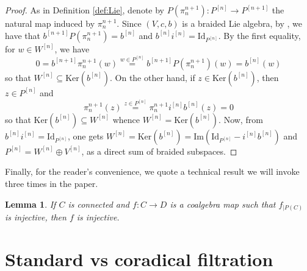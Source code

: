 \documentclass[english]{amsart}
\numberwithin{equation}{section}
\numberwithin{figure}{section}
\theoremstyle{plain}
\theoremstyle{definition}
\theoremstyle{definition}
\theoremstyle{remark}
\theoremstyle{remark}
\theoremstyle{plain}
\newtheorem{lem}[thm]{Lemma}
\theoremstyle{plain}
\theoremstyle{plain}
\begin{document}
\begin{proof}
As in Definition \ref{def:Lie}, denote by $P\left(\pi_{n}^{n+1}\right):P^{[n]}\rightarrow P^{[n+1]}$ the natural map induced by $\pi_{n}^{n+1}$. Since $\left(V,c,b\right)$ is a braided Lie algebra, by \cite[Proposition 5.7]{Ardizzoni-MMPrim},
we have that $b^{\left[n+1\right]}P\left(\pi_{n}^{n+1}\right)=b^{\left[n\right]}$
and $b^{\left[n\right]}i^{\left[n\right]}=\mathrm{Id}_{P^{\left[n\right]}}$.
By the first equality, for $w\in W^{\left[n\right]}$, we have \[
0=b^{\left[n+1\right]}\pi_{n}^{n+1}\left(w\right)\overset{w\in P^{\left[n\right]}}{=}b^{\left[n+1\right]}P\left(\pi_{n}^{n+1}\right)\left(w\right)=b^{\left[n\right]}\left(w\right)\]
so that $W^{\left[n\right]}\subseteq\mathrm{Ker}\left(b^{\left[n\right]}\right)$.
On the other hand, if $z\in\mathrm{Ker}\left(b^{\left[n\right]}\right)$,
then $z\in P^{\left[n\right]}$ and \[
\pi_{n}^{n+1}\left(z\right)\overset{z\in P^{\left[n\right]}}{=}\pi_{n}^{n+1}i^{\left[n\right]}b^{\left[n\right]}\left(z\right)=0\]
so that $\mathrm{Ker}\left(b^{\left[n\right]}\right)\subseteq W^{\left[n\right]}$
whence $W^{\left[n\right]}=\mathrm{Ker}\left(b^{\left[n\right]}\right)$.
Now, from $b^{\left[n\right]}i^{\left[n\right]}=\mathrm{Id}_{P^{\left[n\right]}}$,
one gets $W^{\left[n\right]}=\mathrm{Ker}\left(b^{\left[n\right]}\right)=\mathrm{Im}\left(\mathrm{Id}_{P^{\left[n\right]}}-i^{\left[n\right]}b^{\left[n\right]}\right)$
and $P^{\left[n\right]}=W^{\left[n\right]}\oplus V^{\left[n\right]}$,
as a direct sum of braided subspaces.
\end{proof}

Finally, for the reader's convenience, we quote a technical result we will invoke three times in the paper.

\begin{lem}\label{lem:Heyneman-Radford}
\cite[Lemma 5.3.3]{Montgomery} If $C$ is connected and $f:C\rightarrow D$ is a coalgebra map such that $f_{\mid P(C)}$ is injective, then $f$ is injective.
\end{lem}


\section{Standard vs coradical filtration\label{sec:StandardCorad}}
\end{document}
